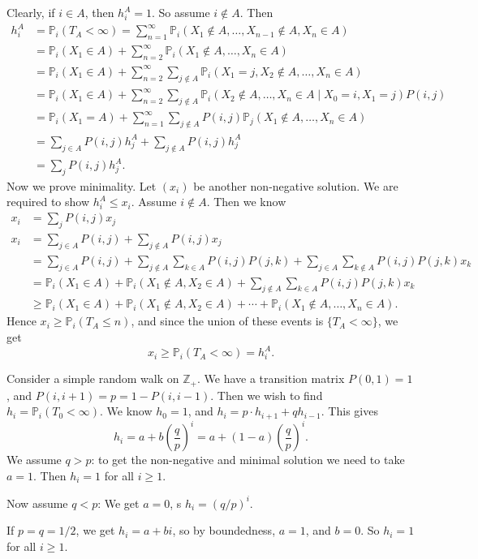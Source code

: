\documentclass[12pt]{article}
\begin{document}
\begin{proofbox}
	Clearly, if $i \in A$, then $h_i^{A} = 1$. So assume $i \not \in A$. Then
\begin{align*}
	h_i^{A} &= \mathbb{P}_i(T_A < \infty) = \sum_{n = 1}^{\infty} \mathbb{P}_i(X_1 \not \in A, \ldots, X_{n-1} \not \in A, X_n \in A) \\
		&= \mathbb{P}_i(X_1 \in A) + \sum_{n = 2}^{\infty} \mathbb{P}_i(X_1 \not \in A, \ldots, X_n \in A) \\
		&= \mathbb{P}_i(X_1 \in A) + \sum_{n = 2}^{\infty} \sum_{j \not \in A} \mathbb{P}_i(X_1 = j, X_2 \not \in A, \ldots, X_n \in A) \\
		&= \mathbb{P}_i(X_1 \in A) + \sum_{n = 2}^{\infty} \sum_{j \not \in A}\mathbb{P}_i(X_2 \not \in A, \ldots, X_n \in A \mid X_0 = i, X_1 = j) P(i, j) \\
		&= \mathbb{P}_i(X_1 = A) + \sum_{n = 1}^{\infty} \sum_{j \not \in A}P(i, j) \mathbb{P}_j(X_1 \not \in A, \ldots, X_n \in A) \\
		&= \sum_{j \in A}P(i, j) h_j^{A} + \sum_{j \not \in A}P(i, j) h_j^{A} \\
		&= \sum_{j} P(i, j) h_j^{A}.
\end{align*}
Now we prove minimality. Let $(x_i)$ be another non-negative solution. We are required to show $h_i^{A} \leq x_i$. Assume $i \not \in A$. Then we know
\begin{align*}
	x_i &= \sum_{j}P(i, j)x_j \\
	x_i &= \sum_{j \in A}P(i, j) + \sum_{j \not \in A}P(i, j)x_j \\
	    &= \sum_{j \in A}P(i, j) + \sum_{j \not \in A}\sum_{k \in A}P(i, j)P(j, k) + \sum_{j \in A}\sum_{k \not \in A}P(i, j)P(j, k) x_k \\
	    &= \mathbb{P}_i(X_1 \in A) + \mathbb{P}_i(X_1 \not \in A, X_2 \in A) + \sum_{j \not \in A}\sum_{k \in A}P(i, j)P(j, k)x_k \\
	    &\geq \mathbb{P}_i(X_1 \in A) + \mathbb{P}_i(X_1 \not \in A, X_2 \in A) + \cdots + \mathbb{P}_i(X_1 \not \in A, \ldots, X_n \in A).
\end{align*}
Hence $x_i \geq \mathbb{P}_i(T_A \leq n)$, and since the union of these events is $\{T_A < \infty\}$, we get
\[
	x_i \geq \mathbb{P}_i(T_A < \infty) = h_i^{A}
.\] 
\end{proofbox}

\begin{exbox}
	Consider a simple random walk on $\mathbb{Z}_{+}$. We have a transition matrix $P(0, 1) = 1$, and $P(i, i+1) = p = 1 - P(i, i-1)$. Then we wish to find $h_i = \mathbb{P}_i(T_0 < \infty)$. We know $h_0 = 1$, and $h_i = p \cdot h_{i+1} + q h_{i-1}$. This gives
	\[
		h_i = a + b \left( \frac{q}{p} \right)^{i} = a + (1 - a) \left( \frac{q}{p} \right)^{i}
	.\]
	We assume $q > p$: to get the non-negative and minimal solution we need to take $a = 1$. Then $h_i = 1$ for all $i \geq 1$.

	Now assume $q < p$: We get $a = 0$, s $h_i = (q/p)^{i}$.

	If $p = q = 1/2$, we get $h_i = a + bi$, so by boundedness, $a = 1$, and $b = 0$. So $h_i = 1$ for all $i \geq 1$.
\end{exbox}
\end{document}
